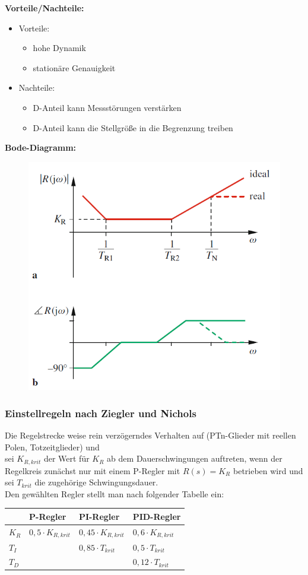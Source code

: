 \documentclass[10pt,a4paper]{article}
\begin{document}
\textbf{Vorteile/Nachteile:}
\begin{itemize}
	\item Vorteile:
	\begin{itemize}
		\item hohe Dynamik
		\item stationäre Genauigkeit
	\end{itemize}
	\item Nachteile:
	\begin{itemize}
		\item D-Anteil kann Messstörungen verstärken
		\item D-Anteil kann die Stellgröße in die Begrenzung treiben 
	\end{itemize}
\end{itemize}

\textbf{Bode-Diagramm:}
\begin{figure}[H]
	\includegraphics[width = 0.4\columnwidth]{imgs/pid-regler.png}
\end{figure}

\subsubsection{Einstellregeln nach Ziegler und Nichols}
Die Regelstrecke weise rein verzögerndes Verhalten auf (PTn-Glieder mit reellen Polen, Totzeitglieder) und \\
sei $K_{R,krit}$ der Wert für $K_R$ ab dem Dauerschwingungen auftreten, wenn der Regelkreis zunächst nur mit einem P-Regler mit $R(s) = K_R$ betrieben wird und \\
sei $T_{krit}$ die zugehörige Schwingungsdauer. \\

Den gewählten Regler stellt man nach folgender Tabelle ein: \\

\begin{tabular}{l|lll}
	& P-Regler & PI-Regler & PID-Regler \\
	\hline
	$K_R$ & $0,5 ⋅ K_{R,krit}$ & $0,45 ⋅ K_{R,krit}$ & $0,6 ⋅ K_{R,krit}$ \\
	$T_I$ & & $0,85 ⋅ T_{krit}$ & $0,5 ⋅ T_{krit}$ \\
	$T_D$ & & & $0,12 ⋅ T_{krit}$
\end{tabular}
\end{document}
